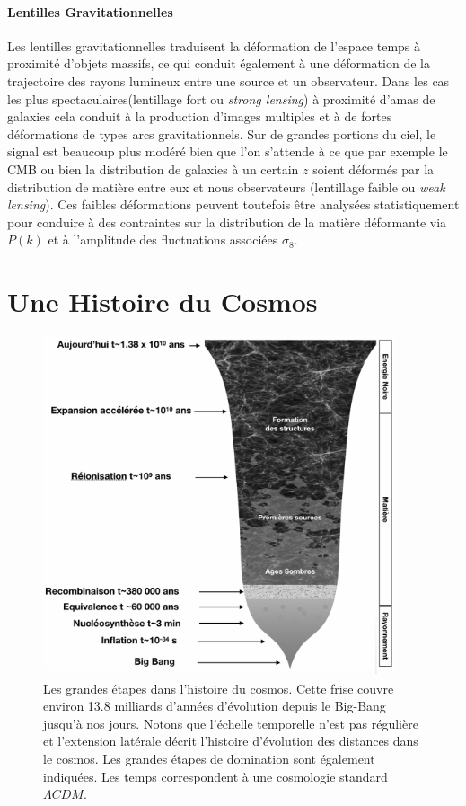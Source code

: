 \paragraph{Lentilles Gravitationnelles}
Les lentilles gravitationnelles traduisent la déformation de l'espace temps à proximité d'objets massifs, ce qui conduit également à une déformation de la trajectoire des rayons lumineux entre une source et un observateur. Dans les cas les plus spectaculaires(lentillage fort ou \textit{strong lensing}) à proximité d'amas de galaxies  cela conduit à la production d'images multiples et à de fortes déformations de types arcs gravitationnels. Sur de grandes portions du ciel, le signal est beaucoup plus modéré bien que l'on s'attende à ce que par exemple le CMB ou bien la distribution de galaxies à un certain $z$ soient déformés par la distribution de matière entre eux et nous observateurs (lentillage faible ou \textit{weak lensing}). Ces faibles déformations peuvent toutefois être analysées statistiquement pour conduire à des contraintes sur la distribution de la matière déformante via $P(k)$ et à l'amplitude des fluctuations associées $\sigma_8$.

\section{Une Histoire du Cosmos}
\begin{figure}[htbp]
	\centering
		\includegraphics[height=10cm]{figs/timeline.png}
		\caption[Les grandes étapes dans l'histoire du cosmos]{Les grandes étapes dans l'histoire du cosmos. Cette frise couvre environ 13.8 milliards d'années d'évolution depuis le Big-Bang  jusqu'à nos jours. Notons que l'échelle temporelle n'est pas régulière et l'extension latérale décrit l'histoire d'évolution des distances dans le cosmos. Les grandes étapes de domination sont également indiquées. Les temps correspondent à une cosmologie standard $\Lambda CDM$.}
	\label{f:timeline}
\end{figure}

